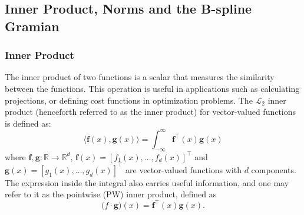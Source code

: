 
\subsection{Inner Product, Norms and the B-spline Gramian}\label{sec:inner-product}
\subsubsection{Inner Product}
The inner product of two functions is a scalar that measures the similarity between the functions. This operation is useful in applications such as calculating projections, or defining cost functions in optimization problems. The $\mathcal L_2$ inner product (henceforth referred to as the inner product) for vector-valued functions is defined as:
\begin{equation}
    \label{eq:dot-product}
    \langle\mathbf f(x), \mathbf g(x)\rangle = \int_{-\infty}^\infty \mathbf f^\top(x) \mathbf g(x)
\end{equation}
where $\mathbf f, \mathbf g: \mathbb{R} \to \mathbb{R}^d$, $\mathbf f(x) = [f_1(x), \ldots, f_d(x)]^\top$ and $\mathbf g(x) = [g_1(x), \ldots, g_d(x)]^\top$ are vector-valued functions with $d$ components. The expression inside the integral also carries useful information, and one may refer to it as the pointwise (PW) inner product, defined as
\begin{equation}
    \label{eq:dot-product-pointwise}
    \mathbf (f\cdot \mathbf g)(x) = \mathbf f^\top(x) \mathbf g(x).
\end{equation}

